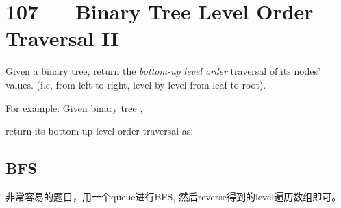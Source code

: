 \section{107 --- Binary Tree Level Order Traversal II}
Given a binary tree, return the \textit{bottom-up level order} traversal of its nodes' values. (i.e, from left to right, level by level from leaf to root).

For example:
Given binary tree ,

\begin{figure}[H]
\end{figure}

return its bottom-up level order traversal as:

\fcj{[ [15,7], [9,20], [3] ]}

\subsection{BFS}
非常容易的题目，用一个queue进行BFS, 然后reverse得到的level遍历数组即可。
